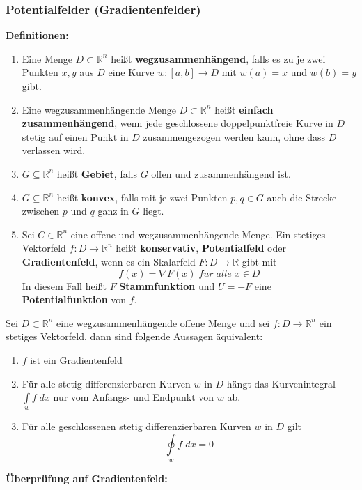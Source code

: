 \documentclass[a4paper,twocolumn,10pt]{article}
\begin{document}
\subsubsection{Potentialfelder (Gradientenfelder)}
\textbf{Definitionen:}
\begin{enumerate}[label=$\bullet$]
\item Eine Menge $D\subset\mathbb{R}^n$ heißt \textbf{wegzusammenhängend}, falls es zu je zwei Punkten $x,y$ aus $D$ eine Kurve $w:[a,b]\rightarrow D$ mit $w(a)=x$ und $w(b)=y$ gibt.
\item Eine wegzusammenhängende Menge $D\subset\mathbb{R}^n$ heißt \textbf{einfach zusammenhängend}, wenn jede geschlossene doppelpunktfreie Kurve in $D$ stetig auf einen Punkt in $D$ zusammengezogen werden kann, ohne dass $D$ verlassen wird.
\item $G\subseteq\mathbb{R}^n$ heißt \textbf{Gebiet}, falls $G$ offen und zusammenhängend ist.
\item $G\subseteq\mathbb{R}^n$ heißt \textbf{konvex}, falls mit je zwei Punkten $p,q\in G$ auch die Strecke zwischen $p$ und $q$ ganz in $G$ liegt.
\item Sei $C\in\mathbb{R}^n$ eine offene und wegzusammenhängende Menge. Ein stetiges Vektorfeld $f:D\rightarrow\mathbb{R}^n$ heißt \textbf{konservativ}, \textbf{Potentialfeld} oder \textbf{Gradientenfeld}, wenn es ein Skalarfeld $F:D\rightarrow\mathbb{R}$ gibt mit
\begin{equation*}
f(x)=\nabla F(x)\;f\ddot{u}r\;alle\;x\in D
\end{equation*}
In diesem Fall heißt $F$ \textbf{Stammfunktion} und $U=-F$ eine \textbf{Potentialfunktion} von $f$.
\end{enumerate}
Sei $D\subset\mathbb{R}^n$ eine wegzusammenhängende offene Menge und sei $f:D\rightarrow\mathbb{R}^n$ ein stetiges Vektorfeld, dann sind folgende Aussagen äquivalent:
\begin{enumerate}[label=$\bullet$]
\item $f$ ist ein Gradientenfeld
\item Für alle stetig differenzierbaren Kurven $w$ in $D$ hängt das Kurvenintegral $\int\limits_{w}f\;dx$ nur vom Anfangs- und Endpunkt von $w$ ab.
\item Für alle geschlossenen stetig differenzierbaren Kurven $w$ in $D$ gilt
\begin{equation*}
\oint\limits_{w} f\;dx=0
\end{equation*}
\end{enumerate}
\textbf{Überprüfung auf Gradientenfeld:}\\
\end{document}
